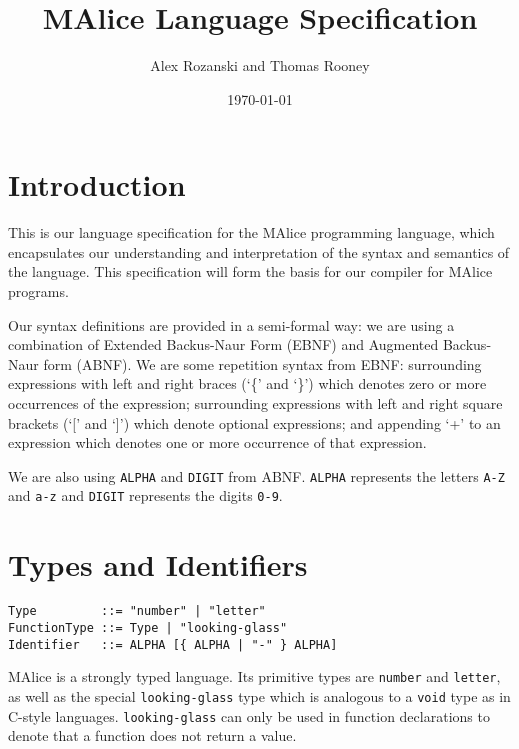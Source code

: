 \documentclass[a4wide, 11pt]{article}
\begin{document}
\title{MAlice Language Specification}

\author{Alex Rozanski and Thomas Rooney}

\date{\today}         %

\maketitle            %

\section{Introduction}

This is our language specification for the MAlice programming language, which encapsulates our understanding and interpretation of the syntax and semantics of the language. This specification will form the basis for our compiler for MAlice programs.

Our syntax definitions are provided in a semi-formal way: we are using a combination of Extended Backus-Naur Form (EBNF) and Augmented Backus-Naur form (ABNF). We are some repetition syntax from EBNF: surrounding expressions with left and right braces (`\{' and `\}') which denotes zero or more occurrences of the expression; surrounding expressions with left and right square brackets (`[' and `]') which denote optional expressions; and appending `+' to an expression which denotes one or more occurrence of that expression.

We are also using \texttt{ALPHA} and \texttt{DIGIT} from ABNF. \texttt{ALPHA} represents the letters \texttt{A-Z} and \texttt{a-z} and \texttt{DIGIT} represents the digits \texttt{0-9}.

\section{Types and Identifiers}

\begin{verbatim}
Type         ::= "number" | "letter"
FunctionType ::= Type | "looking-glass"
Identifier   ::= ALPHA [{ ALPHA | "-" } ALPHA]
\end{verbatim}

MAlice is a strongly typed language. Its primitive types are \texttt{number} and \texttt{letter}, as well as the special \texttt{looking-glass} type which is analogous to a \texttt{void} type as in C-style languages. \texttt{looking-glass} can only be used in function declarations to denote that a function does not return a value.
\end{document}
